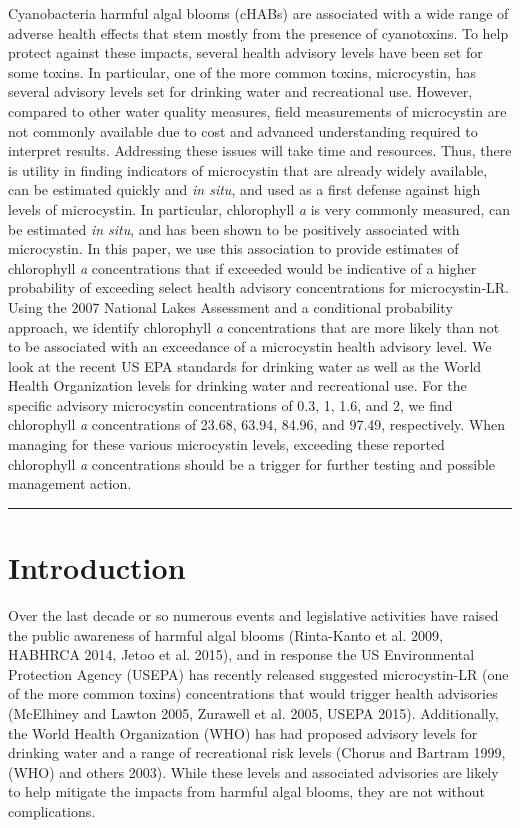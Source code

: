 \documentclass[11pt,]{article}
\begin{document}
Cyanobacteria harmful algal blooms (cHABs) are associated with a wide
range of adverse health effects that stem mostly from the presence of
cyanotoxins. To help protect against these impacts, several health
advisory levels have been set for some toxins. In particular, one of the
more common toxins, microcystin, has several advisory levels set for
drinking water and recreational use. However, compared to other water
quality measures, field measurements of microcystin are not commonly
available due to cost and advanced understanding required to interpret
results. Addressing these issues will take time and resources. Thus,
there is utility in finding indicators of microcystin that are already
widely available, can be estimated quickly and \emph{in situ}, and used
as a first defense against high levels of microcystin. In particular,
chlorophyll \emph{a} is very commonly measured, can be estimated
\emph{in situ}, and has been shown to be positively associated with
microcystin. In this paper, we use this association to provide estimates
of chlorophyll \emph{a} concentrations that if exceeded would be
indicative of a higher probability of exceeding select health advisory
concentrations for microcystin-LR. Using the 2007 National Lakes
Assessment and a conditional probability approach, we identify
chlorophyll \emph{a} concentrations that are more likely than not to be
associated with an exceedance of a microcystin health advisory level. We
look at the recent US EPA standards for drinking water as well as the
World Health Organization levels for drinking water and recreational
use. For the specific advisory microcystin concentrations of 0.3, 1,
1.6, and 2, we find chlorophyll \emph{a} concentrations of 23.68, 63.94,
84.96, and 97.49, respectively. When managing for these various
microcystin levels, exceeding these reported chlorophyll \emph{a}
concentrations should be a trigger for further testing and possible
management action.

\vspace{3mm}

\hrule

\doublespace

\section{Introduction}\label{introduction}

Over the last decade or so numerous events and legislative activities
have raised the public awareness of harmful algal blooms (Rinta-Kanto et
al. 2009, HABHRCA 2014, Jetoo et al. 2015), and in response the US
Environmental Protection Agency (USEPA) has recently released suggested
microcystin-LR (one of the more common toxins) concentrations that would
trigger health advisories (McElhiney and Lawton 2005, Zurawell et al.
2005, USEPA 2015). Additionally, the World Health Organization (WHO) has
had proposed advisory levels for drinking water and a range of
recreational risk levels (Chorus and Bartram 1999, (WHO) and others
2003). While these levels and associated advisories are likely to help
mitigate the impacts from harmful algal blooms, they are not without
complications.
\end{document}
